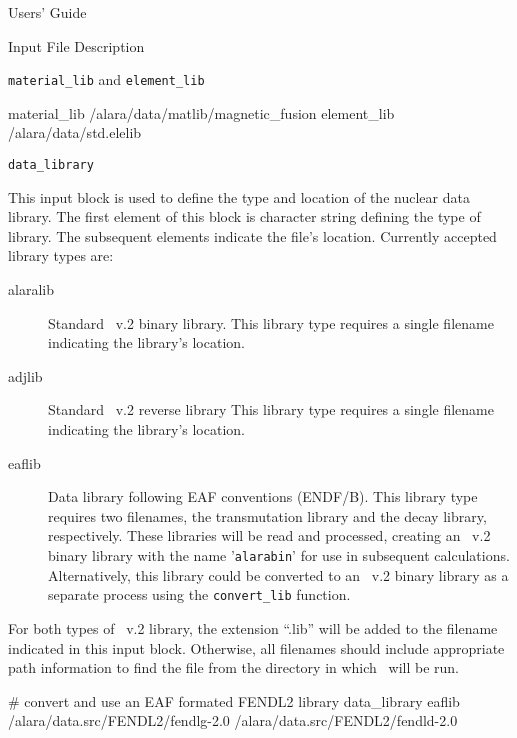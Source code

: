 \begin{chapter}{Users' Guide\label{app:user.guide}}
\begin{section}{Input File Description\label{app:user.input}}
\begin{subsection}{\texttt{material\_lib} and \texttt{element\_lib}\label{app:user.input.matlibs}}
      \begin{center}
        \renewcommand{\baselinestretch}{1}\normalsize
        \begin{boxedverbatim}
material_lib  /alara/data/matlib/magnetic_fusion
element_lib   /alara/data/std.elelib          
\end{boxedverbatim}
      \end{center}
    \end{subsection}

    \begin{subsection}{\texttt{data\_library}\label{sec:user.input.datalib}}
      
      This input block is used to define the type and location of the
      nuclear data library.  The first element of this block is
      character string defining the type of library.  The subsequent
      elements indicate the file's location.  Currently accepted
      library types are:
      \begin{description}
      \item[alaralib] Standard \ALARA\ v.2 binary library.  This
        library type requires a single filename indicating the
        library's location.
      \item[adjlib] Standard \ALARA\ v.2 reverse library  This
        library type requires a single filename indicating the
        library's location.
      \item[eaflib] Data library following EAF conventions (ENDF/B).
        This library type requires two filenames, the transmutation
        library and the decay library, respectively.  These libraries
        will be read and processed, creating an \ALARA\ v.2 binary
        library with the name '\texttt{alarabin}' for use in
        subsequent calculations.  Alternatively, this library could be
        converted to an \ALARA\ v.2 binary library as a separate
        process using the \texttt{convert\_lib} function.
      \end{description}

      For both types of \ALARA\ v.2 library, the extension ``.lib''
      will be added to the filename indicated in this input block.
      Otherwise, all filenames should include appropriate path
      information to find the file from the directory in which \ALARA\
      will be run.

      \begin{center}
        \renewcommand{\baselinestretch}{1}\normalsize
        \begin{boxedverbatim}
# convert and use an EAF formated FENDL2 library
data_library eaflib /alara/data.src/FENDL2/fendlg-2.0
       /alara/data.src/FENDL2/fendld-2.0          
\end{boxedverbatim}
      \end{center}


\end{subsection}
\end{section}
\end{chapter}
